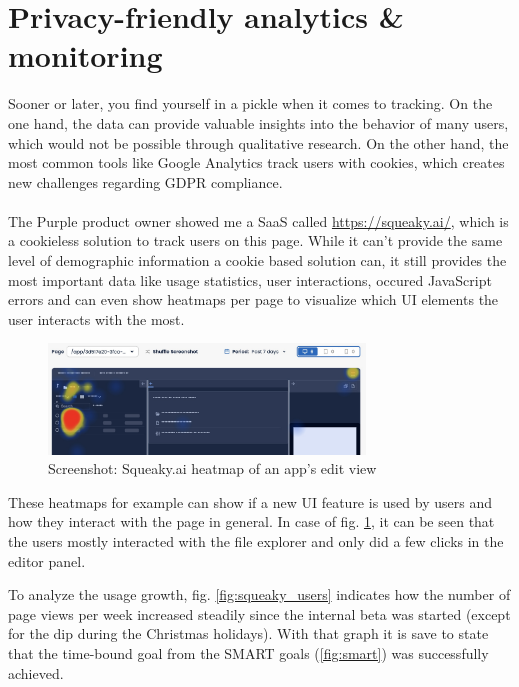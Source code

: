 \section{Privacy-friendly analytics \& monitoring}
\label{sec:analytics}

Sooner or later, you find yourself in a pickle when it comes to tracking.
On the one hand, the data can provide valuable insights into the behavior of many users, which would not be possible through qualitative research.
On the other hand, the most common tools like Google Analytics track users with cookies, which creates new challenges regarding GDPR compliance.
\\\\
The Purple product owner showed me a SaaS called \url{https://squeaky.ai/}, which is a cookieless solution to track users on this page.
While it can't provide the same level of demographic information a cookie based solution can, it still provides the most important data like usage statistics,
user interactions, occured JavaScript errors and can even show heatmaps per page to visualize which UI elements the user interacts with the most.

\begin{figure}[h]
  \centering
  \includegraphics[width=0.75\textwidth]{pics/squeaky_heatmap.jpg}
  \caption{Screenshot: Squeaky.ai heatmap of an app's edit view}
  \label{fig:squeaky}
\end{figure}

These heatmaps for example can show if a new UI feature is used by users and how they interact with the page in general.
In case of fig. \ref{fig:squeaky}, it can be seen that the users mostly interacted with the file explorer and only did a few clicks in the editor panel.

To analyze the usage growth, fig. \ref{fig:squeaky_users} indicates how the number of page views per week increased steadily since the internal beta was started (except for the dip during the Christmas holidays).
With that graph it is save to state that the time-bound goal from the SMART goals (\ref{fig:smart}) was successfully achieved.


